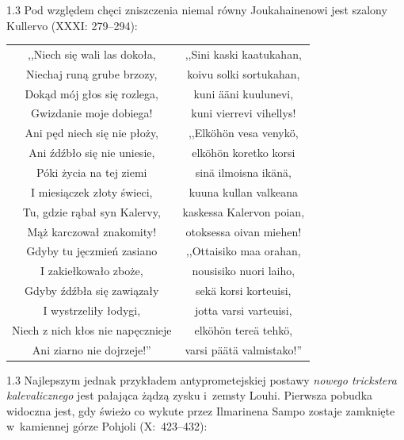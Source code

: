 \documentclass[11pt,a4paper,twoside]{report}
\begin{document}
\begin{spacing}{1.3}
Pod względem chęci zniszczenia niemal równy Joukahainenowi jest szalony Kullervo (XXXI: 279--294):
\end{spacing}
{\centering
\small
\begin{longtable}{c c}
,,Niech się wali las dokoła, & ,,Sini kaski kaatukahan,\\
Niechaj runą grube brzozy, & koivu solki sortukahan,\\
Dokąd mój głos się rozlega, & kuni ääni kuulunevi,\\
Gwizdanie moje dobiega! & kuni vierrevi vihellys!\\
Ani pęd niech się nie płoży, & ,,Elköhön vesa venykö,\\
Ani źdźbło się nie uniesie, & elköhön koretko korsi\\
Póki życia na tej ziemi & sinä ilmoisna ikänä,\\
I miesiączek złoty świeci, & kuuna kullan valkeana\\
Tu, gdzie rąbał syn Kalervy, & kaskessa Kalervon poian,\\
Mąż karczował znakomity! & otoksessa oivan miehen!\\
Gdyby tu jęczmień zasiano & ,,Ottaisiko maa orahan,\\
I zakiełkowało zboże, & nousisiko nuori laiho,\\
Gdyby źdźbła się zawiązały & sekä korsi korteuisi,\\
I wystrzeliły łodygi, & jotta varsi varteuisi,\\
Niech z nich kłos nie napęcznieje & elköhön tereä tehkö,\\
Ani ziarno nie dojrzeje!'' & varsi päätä valmistako!''\\
\end{longtable}
}
\begin{spacing}{1.3}
Najlepszym jednak przykładem antyprometejskiej postawy \emph{nowego trickstera kalevalicznego} jest pałająca żądzą zysku i~zemsty Louhi. Pierwsza pobudka widoczna jest, gdy świeżo co wykute przez Ilmarinena Sampo zostaje zamknięte w~kamiennej górze Pohjoli (X:~423--432):
\end{spacing}
\newpage

\end{document}
